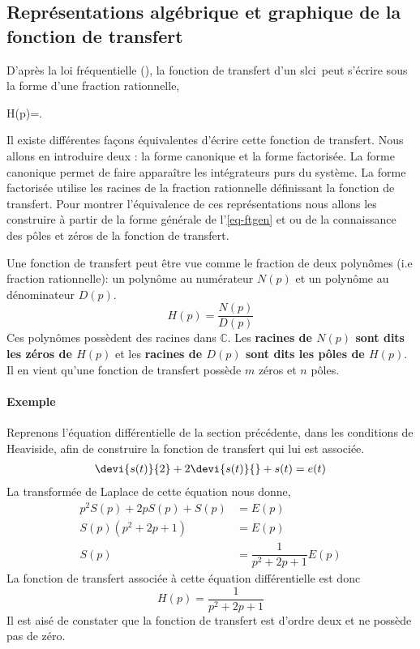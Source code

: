 \subsection[Représentation de la fonction de transfert]{Représentations algébrique et graphique de la fonction de transfert}

D'après la loi fréquentielle (), la fonction de transfert 
d'un \gls{slci}~peut s'écrire sous la forme d'une fraction rationnelle,
\begin{bequation}
H(p)=. \label{eq-ftgen}
\end{bequation}

Il existe différentes façons équivalentes d'écrire cette fonction de transfert. 
Nous allons en introduire deux :
la forme canonique et la forme factorisée. La forme canonique permet de faire apparaître 
les intégrateurs purs du système. La forme factorisée utilise les racines de la 
fraction rationnelle définissant la fonction de transfert. 
Pour montrer l'équivalence de ces représentations nous allons les 
construire à partir de la forme générale de l'\cref{eq-ftgen} et ou de la connaissance des pôles et zéros de 
la fonction de transfert.

Une fonction de transfert peut être vue comme le fraction de deux polynômes (i.e fraction rationnelle):
un polynôme au numérateur $N(p)$ et un polynôme au dénominateur $D(p)$.
$$
H(p)=\dfrac{N(p)}{D(p)}
$$
Ces polynômes possèdent des racines dans $\mathbb{C}$. Les \textbf{racines de $N(p)$ sont 
dits les zéros de $H(p)$ }et les \textbf{racines de $D(p)$ 
sont dits les pôles de $H(p)$}. Il en vient qu'une fonction de transfert possède $m$ zéros et $n$ pôles.

\paragraph{Exemple}
Reprenons l'équation différentielle de la section précédente, dans les conditions de Heaviside, afin de construire 
la fonction de transfert qui lui est associée. 
\begin{align}                                                                                                                 
\devi{s(t)}{2}+2\devi{s(t)}{} + s(t) = e(t)  
\end{align}  
La transformée de Laplace de cette équation nous donne,
\begin{align*}                                        
	p^2S(p)+2pS(p)+S(p)&=E(p)\\
	S(p)\left(p^2+2p+1\right)&=E(p)\\
	S(p)&=\dfrac{1}{p^2+2p+1}E(p)
\end{align*}  
La fonction de transfert associée à cette équation différentielle est donc 
$$
H(p)=\dfrac{1}{p^2+2p+1}
$$
Il est aisé de constater que la fonction de transfert est d'ordre deux et ne possède pas de zéro.


